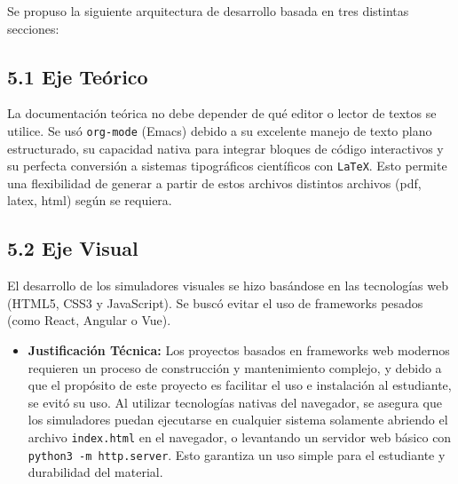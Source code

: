 \documentclass[12 pt]{article}
\begin{document}
Se propuso la siguiente arquitectura de desarrollo basada en tres distintas secciones:

\subsection*{5.1 Eje Teórico}
La documentación teórica no debe depender de qué editor o lector de textos se utilice. Se usó \texttt{org-mode} (Emacs) debido a su excelente manejo de texto plano estructurado, su capacidad nativa para integrar bloques de código interactivos y su perfecta conversión a sistemas tipográficos científicos con \texttt{\LaTeX}. Esto permite una flexibilidad de generar a partir de estos archivos distintos archivos (pdf, latex, html) según se requiera.

\subsection*{5.2 Eje Visual}

El desarrollo de los simuladores visuales se hizo basándose en las tecnologías web (HTML5, CSS3 y JavaScript). Se buscó evitar el uso de frameworks pesados (como React, Angular o Vue).
\begin{itemize}
    \item \textbf{Justificación Técnica:} Los proyectos basados en frameworks web modernos requieren un proceso de construcción y mantenimiento complejo, y debido a que el propósito de este proyecto es facilitar el uso e instalación al estudiante, se evitó su uso. Al utilizar tecnologías nativas del navegador, se asegura que los simuladores puedan ejecutarse en cualquier sistema solamente abriendo el archivo \texttt{index.html} en el navegador, o levantando un servidor web básico con \texttt{python3 -m http.server}. Esto garantiza un uso simple para el estudiante y durabilidad del material.
\end{itemize}
\end{document}
